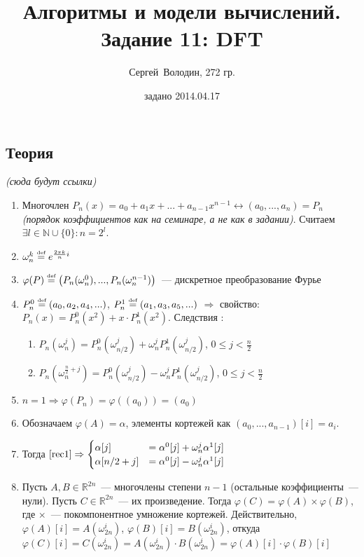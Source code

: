 \documentclass[a4paper]{article}
\date{задано 2014.04.17}
\author{Сергей~Володин, 272 гр.}
\title{Алгоритмы и модели вычислений.\\Задание 11: DFT}
\def\eqdef{\overset{\mbox{\tiny def}}{=}}
\newcommand{\NN}{\mathbb{N}}
\newcommand{\RR}{\mathbb{R}}
\begin{document}
\maketitle
\subsection*{Теория}
{\em(сюда будут ссылки)}
\begin{enumerate}
\item Многочлен $P_n(x)=a_0+a_1x+...+a_{n-1}x^{n-1}\longleftrightarrow (a_0,...,a_n)=P_n$ {\em (порядок коэффициентов как на семинаре, а не как в задании)}. Считаем $\exists l\in\NN\cup\{0\}\colon n=2^l$.
\item $\omega_n^k\eqdef e^{\frac{2\pi k}{n}i}$
\item $\varphi(P)\eqdef \big(P_n(\omega_n^0),...,P_n(\omega_n^{n-1})\big)$~--- дискретное преобразование Фурье
\item $P_n^0\eqdef (a_0,a_2,a_4,...)$, $P_n^1\eqdef (a_1,a_3,a_5,...)$ $\Rightarrow$ свойство: $P_n(x)=P^0_n(x^2)+x\cdot P^1_n(x^2)$. Следствия \label{rec1}:\begin{enumerate}
\item $P_n(\omega_n^j)=P_n^0(\omega_{n/2}^j)+\omega_n^j P_n^1(\omega_{n/2}^j)$, $0\leqslant j<\frac{n}{2}$
\item $P_n(\omega_n^{\frac{n}{2}+j})=P_n^0(\omega_{n/2}^j)- \omega_n^jP_n^1(\omega_{n/2}^j)$, $0\leqslant j < \frac{n}{2}$
\end{enumerate}
\item \label{n1} $n=1\Rightarrow \varphi(P_n)=\varphi((a_0))=(a_0)$ 
\item Обозначаем $\varphi(A)=\alpha$, элементы кортежей как $(a_0,...,a_{n-1})[i]=a_i$.
\item Тогда $\ref{rec1}\Rightarrow\begin{cases}
\alpha[j]&=\alpha^0[j]+\omega_n^j\alpha^1[j]\\
\alpha[n/2+j]&=\alpha^0[j]-\omega_n^j\alpha^1[j]
\end{cases}$
\item \label{mult} Пусть $A,B\in\RR^{2n}$~--- многочлены степени $n-1$ (остальные коэффициенты~--- нули). Пусть $C\in\RR^{2n}$~--- их произведение. Тогда $\varphi(C)=\varphi(A)\times\varphi(B)$, где $\times$~--- покомпонентное умножение кортежей. Действительно, $\varphi(A)[i]=A(\omega_{2n}^i)$, $\varphi(B)[i]=B(\omega_{2n}^i)$, откуда $\varphi(C)[i]=C(\omega_{2n}^i)=A(\omega_{2n}^i)\cdot B(\omega_{2n}^i)=\varphi(A)[i]\cdot\varphi(B)[i]$
\end{enumerate}
\end{document}
